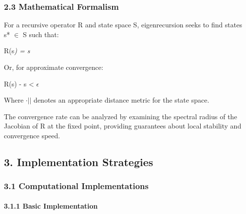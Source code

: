 \documentclass[
]{article}
\begin{document}
\subsubsection{2.3 Mathematical Formalism}\label{mathematical-formalism}

For a recursive operator R and state space S, eigenrecursion seeks to
find states s* \(\in \) S such that:

R(s\emph{) = s}

Or, for approximate convergence:

\textbar\textbar R(s) - s\textbar\textbar{} \textless{} \(\epsilon \)

Where \textbar\textbar{}\(\cdot ||\) denotes an appropriate distance
metric for the state space.

The convergence rate can be analyzed by examining the spectral radius of
the Jacobian of R at the fixed point, providing guarantees about local
stability and convergence speed.

\subsection{3. Implementation
Strategies}\label{implementation-strategies}

\subsubsection{3.1 Computational
Implementations}\label{computational-implementations}

\paragraph{3.1.1 Basic Implementation}\label{basic-implementation}
\end{document}
